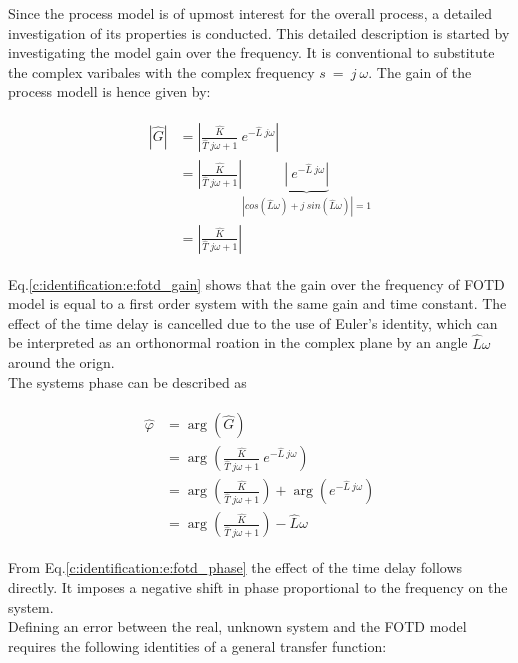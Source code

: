 Since the process model is of upmost interest for the overall process, a detailed investigation of its properties is conducted. This detailed description is started by investigating the model gain over the frequency. It is conventional to substitute the complex varibales with the complex frequency $s~=~j~\omega$. The gain of the process modell is hence given by:

\begin{align}
\begin{split}
\left| \hat{G} \right| &= \left| \frac{\hat{K}}{\hat{T}~j\omega+1} ~ e^{-\hat{L}~j\omega} \right| \\
&= \left| \frac{\hat{K}}{\hat{T}~j\omega+1} \right| \underbrace{\left| ~ e^{-\hat{L}~j\omega} \right|}_{\left|cos(\hat{L}\omega)+j~sin(\hat{L}\omega)\right| = 1} \\
&= \left| \frac{\hat{K}}{\hat{T}~j\omega+1} \right|
\end{split}
\label{c:identification:e:fotd_gain}
\end{align}

Eq.\ref{c:identification:e:fotd_gain} shows that the gain over the frequency of FOTD model is equal to a first order system with the same gain and time constant. The effect of the time delay is cancelled due to the use of Euler's identity, which can be interpreted as an orthonormal roation in the complex plane by an angle $\hat{L}\omega$ around the orign.\\

The systems phase can be described as

\begin{align}
\begin{split}
\hat{\varphi} &= \arg\left( \hat{G} \right) \\
&= \arg\left(\frac{\hat{K}}{\hat{T}~j\omega+1} ~ e^{-\hat{L}~j\omega} \right) \\
&= \arg\left(\frac{\hat{K}}{\hat{T}~j\omega+1}\right) + \arg\left( e^{-\hat{L}~j\omega}\right) \\
&= \arg\left(\frac{\hat{K}}{\hat{T}~j\omega+1}\right) - \hat{L}\omega
\end{split}
\label{c:identification:e:fotd_phase}
\end{align}

From Eq.\ref{c:identification:e:fotd_phase} the effect of the time delay follows directly. It imposes a negative shift in phase proportional to the frequency on the system. \\

Defining an error between the real, unknown system and the FOTD model requires the following identities of a general transfer function:

